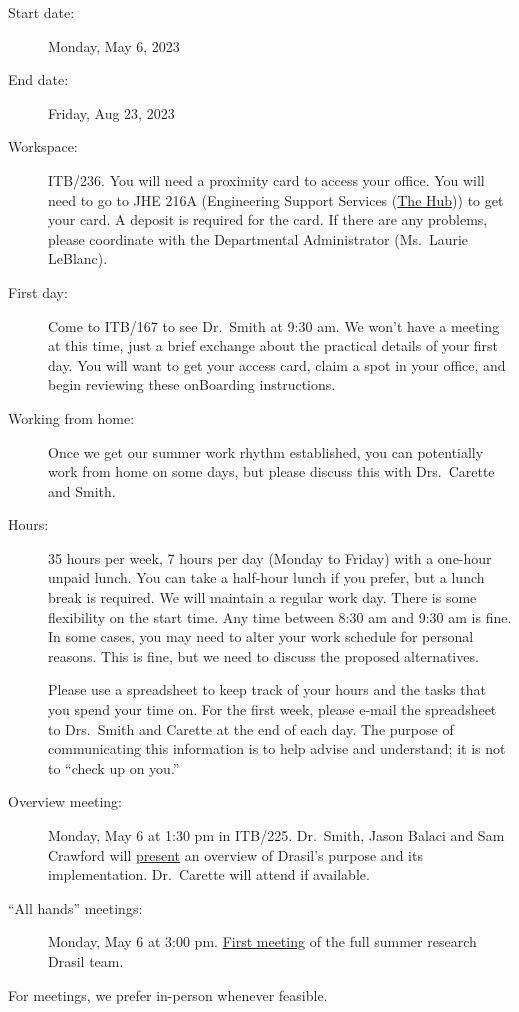 \documentclass[12pt]{article}
\begin{document}
\begin{description}

\item [Start date:] Monday, May 6, 2023

\item [End date:] Friday, Aug 23, 2023

\item [Workspace:] ITB/236. You will need a proximity card to access your
office.  You will need to go to JHE 216A (Engineering Support Services
(\href{https://www.eng.mcmaster.ca/engineering-support-services-hub/} {The
Hub})) to get your card.  A deposit is required for the card.  If there are any
problems, please coordinate with the Departmental Administrator (Ms.\ Laurie
LeBlanc).  

\item [First day:] Come to ITB/167 to see Dr.\ Smith at 9:30 am.  We won't have
a meeting at this time, just a brief exchange about the practical details of
your first day.  You will want to get your access card, claim a spot in your office,
and begin reviewing these onBoarding instructions.

\item [Working from home:] Once we get our summer work rhythm established, you
can potentially work from home on some days, but please discuss this with Drs.\
Carette and Smith.

\item [Hours:] 35 hours per week, 7 hours per day (Monday to Friday) with a
one-hour unpaid lunch.  You can take a half-hour lunch if you prefer, but a
lunch break is required. We will maintain a regular work day.  There is some
flexibility on the start time.  Any time between 8:30 am and 9:30 am is fine.
In some cases, you may need to alter your work schedule for personal reasons.
This is fine, but we need to discuss the proposed alternatives.

Please use a spreadsheet to keep track of your hours and the tasks that you
spend your time on.  For the first week, please e-mail the spreadsheet to Drs.\
Smith and Carette at the end of each day.  The purpose of communicating this
information is to help advise and understand; it is not to ``check up on you.''

\item [Overview meeting:] Monday, May 6 at 1:30 pm in ITB/225.  Dr.\ Smith,
Jason Balaci and Sam Crawford will
\href{https://github.com/JacquesCarette/Drasil/issues/3715} {present} an
overview of Drasil's purpose and its implementation.  Dr.\ Carette will attend
if available.

\item [``All hands'' meetings:] Monday, May 6 at 3:00 pm.
\href{https://github.com/JacquesCarette/Drasil/issues/3714} {First meeting} of
the full summer research Drasil team.

\end{description}
For meetings, we prefer in-person whenever feasible.
\end{document}
